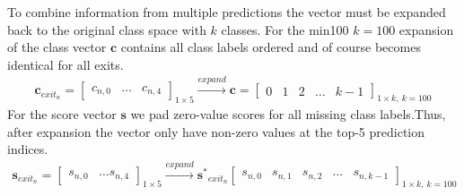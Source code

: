 To combine information from multiple predictions the vector must be expanded back to the original class space with $k$ classes. For the \gls{min100} $k=100$ expansion of the class vector $\mathbf{c}$ contains all class labels ordered and of course becomes identical for all exits.
\begin{align*}
\mathbf{c}_{exit_n}= 
\begin{bmatrix}
c_{n,0} & \dots & c_{n,4}
\end{bmatrix}_{1 \times 5}
\xrightarrow{expand} 
\mathbf{c} =
\begin{bmatrix}
0 & 1 & 2 & \dots & k-1
\end{bmatrix}_{1 \times k,\: k=100} 
\end{align*} 
For the score vector $\mathbf{s}$ we pad zero-value scores for all missing class labels.Thus, after expansion the vector only have non-zero values at the top-5 prediction indices.
\begin{align*}
\mathbf{s}_{exit_n} = 
\begin{bmatrix}
s_{n,0} & \dots s_{n,4}
\end{bmatrix}_{1 \times 5} 
\xrightarrow{expand}
\mathbf{s^*}_{exit_n}
\begin{bmatrix}
s_{n,0} & s_{n,1} & s_{n,2} &\dots & s_{n,k-1}
\end{bmatrix}_{1 \times k,\: k=100} 
\end{align*}
